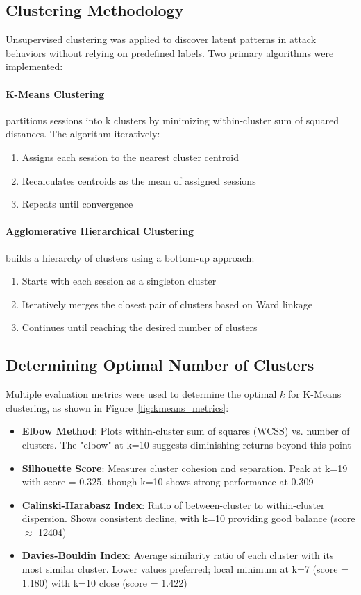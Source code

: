 \documentclass[acmlarge,screen,nonacm]{acmart}
\begin{document}
\subsection{Clustering Methodology}

Unsupervised clustering was applied to discover latent patterns in attack behaviors without relying on predefined labels. Two primary algorithms were implemented:

\paragraph{K-Means Clustering} partitions sessions into k clusters by minimizing within-cluster sum of squared distances. The algorithm iteratively:
\begin{enumerate}
    \item Assigns each session to the nearest cluster centroid
    \item Recalculates centroids as the mean of assigned sessions
    \item Repeats until convergence
\end{enumerate}

\paragraph{Agglomerative Hierarchical Clustering} builds a hierarchy of clusters using a bottom-up approach:
\begin{enumerate}
    \item Starts with each session as a singleton cluster
    \item Iteratively merges the closest pair of clusters based on Ward linkage
    \item Continues until reaching the desired number of clusters
\end{enumerate}

\subsection{Determining Optimal Number of Clusters}

Multiple evaluation metrics were used to determine the optimal $k$ for K-Means clustering, as shown in Figure~\ref{fig:kmeans_metrics}:

\begin{itemize}
    \item \textbf{Elbow Method}: Plots within-cluster sum of squares (WCSS) vs. number of clusters. The "elbow" at k=10 suggests diminishing returns beyond this point
    \item \textbf{Silhouette Score}: Measures cluster cohesion and separation. Peak at k=19 with score = 0.325, though k=10 shows strong performance at 0.309
    \item \textbf{Calinski-Harabasz Index}: Ratio of between-cluster to within-cluster dispersion. Shows consistent decline, with k=10 providing good balance (score $\approx$ 12404)
    \item \textbf{Davies-Bouldin Index}: Average similarity ratio of each cluster with its most similar cluster. Lower values preferred; local minimum at k=7 (score = 1.180) with k=10 close (score = 1.422)
\end{itemize}
\end{document}
